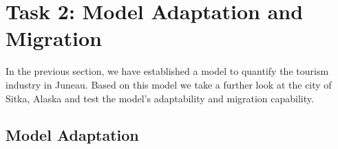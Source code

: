 \section{Task 2: Model Adaptation and Migration}

In the previous section, we have established a model to quantify 
the tourism industry in Juneau. 
Based on this model we take a further look at the city of Sitka, Alaska and
test the model's adaptability and migration capability.

\subsection{Model Adaptation}